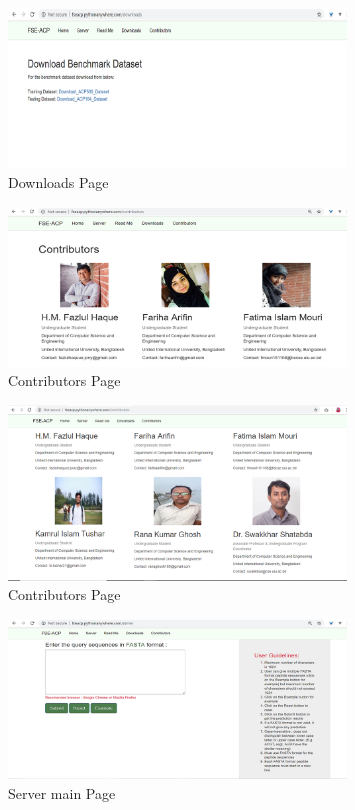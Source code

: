 \begin{figure}[H]
\centering
 \includegraphics[width=0.8\textwidth]{dataset.png}
 \caption{Downloads Page}
\end{figure}
\begin{figure}[H]
\centering
 \includegraphics[width=0.8\textwidth]{contri1.png}
 \caption{Contributors Page}
\end{figure}
\begin{figure}[H]
\centering
 \includegraphics[width=0.8\textwidth]{contri2.png}
 \caption{Contributors Page}
\end{figure}
\begin{figure}[H]
\centering
 \includegraphics[width=0.8\textwidth]{server1.png}
 \caption{Server main Page}
\end{figure}
